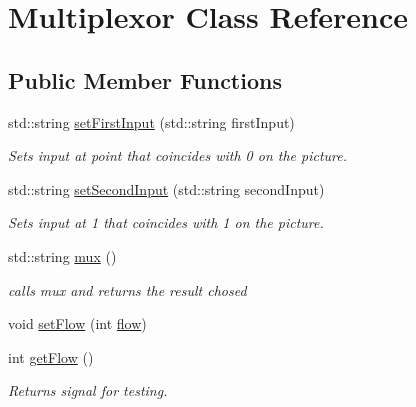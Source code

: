 \hypertarget{class_multiplexor}{}\section{Multiplexor Class Reference}
\label{class_multiplexor}
\subsection*{Public Member Functions}
\begin{DoxyCompactItemize}
\item 
\mbox{\label{class_multiplexor_a69c9a975586cc73853780b769e275763}} 
std\+::string \mbox{\hyperlink{class_multiplexor_a69c9a975586cc73853780b769e275763}{set\+First\+Input}} (std\+::string first\+Input)
\begin{DoxyCompactList}\small\item\em Set\textquotesingle{}s input at point that coincides with 0 on the picture. \end{DoxyCompactList}\item 
\mbox{\label{class_multiplexor_afcc3b61e4bb50501e5f11f81d6603641}} 
std\+::string \mbox{\hyperlink{class_multiplexor_afcc3b61e4bb50501e5f11f81d6603641}{set\+Second\+Input}} (std\+::string second\+Input)
\begin{DoxyCompactList}\small\item\em Sets input at 1 that coincides with 1 on the picture. \end{DoxyCompactList}\item 
\mbox{\label{class_multiplexor_aa6d73bfebf640401b42562534694cd02}} 
std\+::string \mbox{\hyperlink{class_multiplexor_aa6d73bfebf640401b42562534694cd02}{mux}} ()
\begin{DoxyCompactList}\small\item\em calls mux and returns the result chosed \end{DoxyCompactList}\item 
void \mbox{\hyperlink{class_multiplexor_aaf700f773d80deaa3af4cb8aec0f9b41}{set\+Flow}} (int \mbox{\hyperlink{class_multiplexor_aa38f2d5057c2c76b799fa66645662b55}{flow}})
\item 
\mbox{\label{class_multiplexor_aa2483f83fbb3c17b0ffcff36893f4314}} 
int \mbox{\hyperlink{class_multiplexor_aa2483f83fbb3c17b0ffcff36893f4314}{get\+Flow}} ()
\begin{DoxyCompactList}\small\item\em Returns signal for testing. \end{DoxyCompactList}\end{DoxyCompactItemize}
